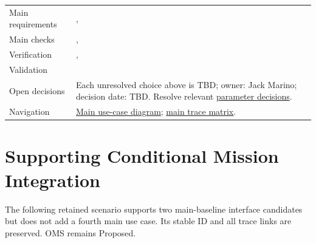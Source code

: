 \begin{tabularx}{\linewidth}{L{3.2cm}Y}
Main requirements & , \\
Main checks & , \\
Verification & , \\
Validation & \\
Open decisions & Each unresolved choice above is TBD; owner: Jack Marino; decision date: TBD. Resolve relevant \hyperref[Table:RequirementParameters]{parameter decisions}.\\
Navigation & \hyperref[Figure:UseCaseDiagram]{Main use-case diagram}; \hyperref[Table:TraceabilityMatrix]{main trace matrix}.\\
\end{tabularx}
\normalsize
\section{Supporting Conditional Mission Integration}
The following retained scenario supports two main-baseline interface candidates but does not add a fourth main use case. Its stable ID and all trace links are preserved. OMS remains Proposed.

